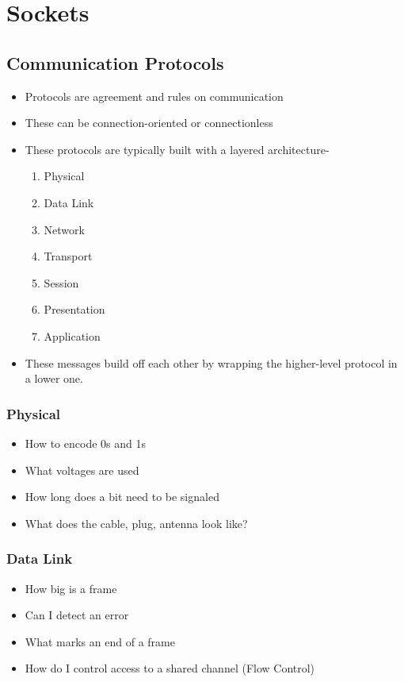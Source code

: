 \section{Sockets}\label{sec:Sockets}
\subsection{Communication Protocols}\label{subsec:Communication_Protocols}
\begin{itemize}
\item Protocols are agreement and rules on communication
\item These can be connection-oriented or connectionless
\item These protocols are typically built with a layered architecture-
  \begin{enumerate}
  \item Physical
  \item Data Link
  \item Network
  \item Transport
  \item Session
  \item Presentation
  \item Application
  \end{enumerate}
\item These messages build off each other by wrapping the higher-level protocol in a lower one.
\end{itemize}

\subsubsection{Physical}\label{subsubsec:Physical_Protocols}
\begin{itemize}
\item How to encode 0s and 1s
\item What voltages are used
\item How long does a bit need to be signaled
\item What does the cable, plug, antenna look like?
\end{itemize}

\subsubsection{Data Link}\label{subsubsec:Data_Link_Protocols}
\begin{itemize}
\item How big is a frame
\item Can I detect an error
\item What marks an end of a frame
\item How do I control access to a shared channel (Flow Control)
\end{itemize}

